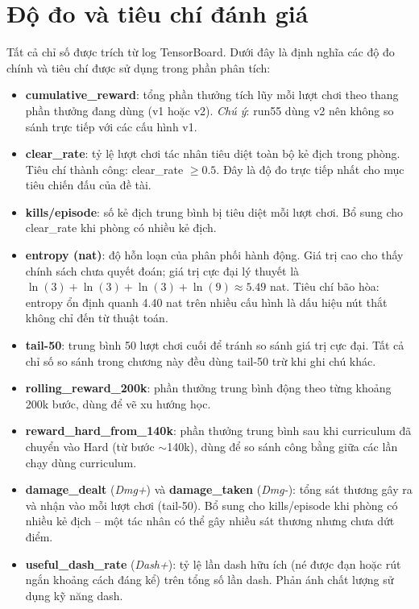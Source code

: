 \section{Độ đo và tiêu chí đánh giá}
\label{sec:eval_metrics}

Tất cả chỉ số được trích từ log TensorBoard. Dưới đây là định nghĩa các độ đo chính và tiêu chí được sử dụng trong phần phân tích:

\begin{itemize}
    \item \textbf{cumulative\_reward}: tổng phần thưởng tích lũy mỗi lượt chơi theo thang phần thưởng đang dùng (v1 hoặc v2). \textit{Chú ý}: run55 dùng v2 nên không so sánh trực tiếp với các cấu hình v1.
    \item \textbf{clear\_rate}: tỷ lệ lượt chơi tác nhân tiêu diệt toàn bộ kẻ địch trong phòng. Tiêu chí thành công: clear\_rate $\geq 0.5$. Đây là độ đo trực tiếp nhất cho mục tiêu chiến đấu của đề tài.
    \item \textbf{kills/episode}: số kẻ địch trung bình bị tiêu diệt mỗi lượt chơi. Bổ sung cho clear\_rate khi phòng có nhiều kẻ địch.
    \item \textbf{entropy (nat)}: độ hỗn loạn của phân phối hành động. Giá trị cao cho thấy chính sách chưa quyết đoán; giá trị cực đại lý thuyết là $\ln(3)+\ln(3)+\ln(3)+\ln(9) \approx 5.49$ nat. Tiêu chí bão hòa: entropy ổn định quanh 4.40 nat trên nhiều cấu hình là dấu hiệu nút thắt không chỉ đến từ thuật toán.
    \item \textbf{tail-50}: trung bình 50 lượt chơi cuối để tránh so sánh giá trị cực đại. Tất cả chỉ số so sánh trong chương này đều dùng tail-50 trừ khi ghi chú khác.
    \item \textbf{rolling\_reward\_200k}: phần thưởng trung bình động theo từng khoảng 200k bước, dùng để vẽ xu hướng học.
    \item \textbf{reward\_hard\_from\_140k}: phần thưởng trung bình sau khi curriculum đã chuyển vào Hard (từ bước $\sim$140k), dùng để so sánh công bằng giữa các lần chạy dùng curriculum.
    \item \textbf{damage\_dealt} (\textit{Dmg+}) và \textbf{damage\_taken} (\textit{Dmg-}): tổng sát thương gây ra và nhận vào mỗi lượt chơi (tail-50). Bổ sung cho kills/episode khi phòng có nhiều kẻ địch -- một tác nhân có thể gây nhiều sát thương nhưng chưa dứt điểm.
    \item \textbf{useful\_dash\_rate} (\textit{Dash+}): tỷ lệ lần dash hữu ích (né được đạn hoặc rút ngắn khoảng cách đáng kể) trên tổng số lần dash. Phản ánh chất lượng sử dụng kỹ năng dash.

\end{itemize}
